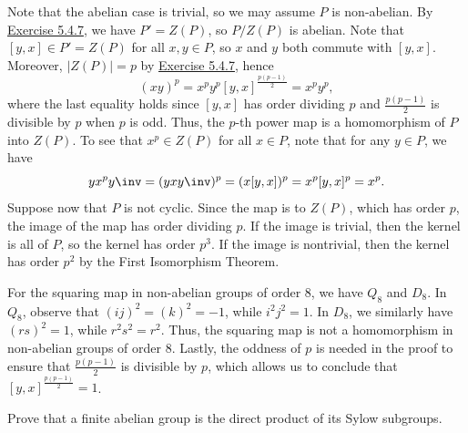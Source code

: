 \begin{sol}
    Note that the abelian case is trivial, so we may assume $P$ is non-abelian. By \hyperref[ex5.4.7]{Exercise 5.4.7}, we have $P' = Z(P)$, so $P/Z(P)$ is abelian. Note that $[y, x] \in P' = Z(P)$ for all $x, y \in P$, so $x$ and $y$ both commute with $[y, x]$. Moreover, $|Z(P)| = p$ by \hyperref[ex5.4.7]{Exercise 5.4.7}, hence
    \[(xy)^p = x^p y^p [y, x]^{\frac{p(p-1)}{2}} = x^p y^p,\]
    where the last equality holds since $[y, x]$ has order dividing $p$ and $\frac{p(p-1)}{2}$ is divisible by $p$ when $p$ is odd. Thus, the $p$-th power map is a homomorphism of $P$ into $Z(P)$. To see that $x^p \in Z(P)$ for all $x \in P$, note that for any $y \in P$, we have
    \[y x^py\inv = (y x y\inv)^p = (x [y, x])^p = x^p [y, x]^p = x^p.\]
    Suppose now that $P$ is not cyclic. Since the map is to $Z(P)$, which has order $p$, the image of the map has order dividing $p$. If the image is trivial, then the kernel is all of $P$, so the kernel has order $p^3$. If the image is nontrivial, then the kernel has order $p^2$ by the First Isomorphism Theorem.

    For the squaring map in non-abelian groups of order 8, we have $Q_8$ and $D_8$. In $Q_8$, observe that $(ij)^2 = (k)^2 = -1$, while $i^2j^2 = 1$. In $D_8$, we similarly have $(rs)^2 = 1$, while $r^2s^2 = r^2$. Thus, the squaring map is not a homomorphism in non-abelian groups of order 8. Lastly, the oddness of $p$ is needed in the proof to ensure that $\frac{p(p-1)}{2}$ is divisible by $p$, which allows us to conclude that $[y, x]^{\frac{p(p-1)}{2}} = 1$.
\end{sol}

\begin{specialexercise}\label{ex5.4.10}
    Prove that a finite abelian group is the direct product of its Sylow subgroups.
\end{specialexercise}

